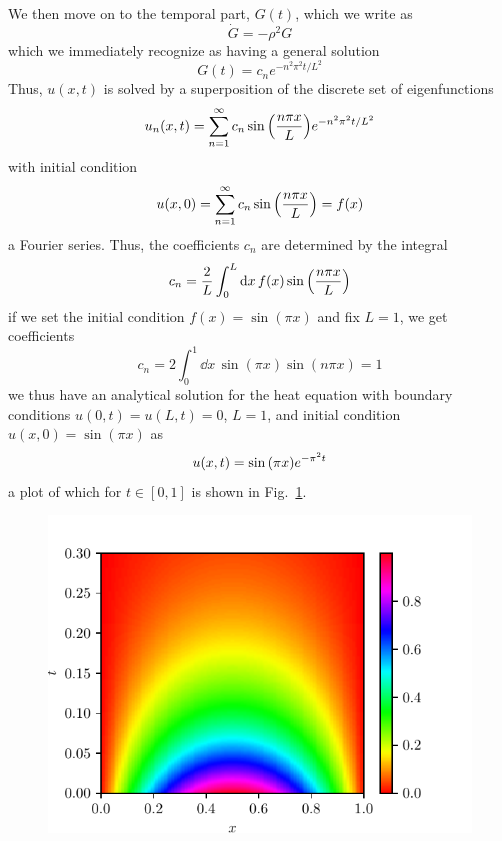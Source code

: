 \documentclass[reprint, english, nofootinbib]{revtex4-2}
\begin{document}
We then move on to the temporal part, $G(t)$, which we write as
\begin{equation}
    \dot G = -\rho^2G
\end{equation}
which we immediately recognize as having a general solution
\begin{equation}
    G(t) = c_n e^{-n^2\pi^2 t / L^2}
\end{equation}
Thus, $u(x, t)$ is solved by a superposition of the discrete set of eigenfunctions
\begin{equation}
    u_n\qty(x, t) = \sum_{n=1}^{\infty} c_n \sin\qty(\frac{n\pi x}{L}) e^{-n^2\pi^2 t / L^2}
\end{equation}
with initial condition
\begin{equation}
    u(x, 0) = \sum_{n=1}^{\infty} c_n \sin\qty(\frac{n\pi x}{L}) = f(x)
\end{equation}
a Fourier series. Thus, the coefficients $c_n$ are determined by the integral
\begin{equation}
    c_n = \frac{2}{L}\int_0^L \dd x \, f(x) \sin\qty(\frac{n\pi x}{L})
\end{equation}
if we set the initial condition $f(x) = \sin(\pi x)$ and fix $L = 1$, we get coefficients
\begin{equation}
    c_n = 2\int_0^1 \dd x \, \sin(\pi x) \sin(n\pi x) = 1
\end{equation}
we thus have an analytical solution for the heat equation with boundary conditions $u(0, t) = u(L, t) = 0$, $L = 1$, and initial condition $u(x, 0) = \sin(\pi x)$ as
\begin{equation}
    u(x, t) = \sin\qty(\pi x) e^{-\pi^2 t}
\end{equation}
a plot of which for $t \in [0, 1]$ is shown in Fig.~\ref{fig: heat eqn analytic}.
\begin{figure}[h!tb]
    \center
    \includegraphics[width=.8\columnwidth]{heat_eqn_analytic.pdf}
    \caption{\label{fig: heat eqn analytic}}
\end{figure}
\end{document}
